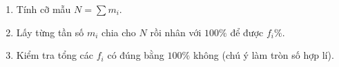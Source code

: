 \begin{enumerate}
\item Tính cỡ mẫu $N = \sum m_i$.
\item Lấy từng tần số $m_i$ chia cho $N$ rồi nhân với $100\%$ để được $f_i\%$.
\item Kiểm tra tổng các $f_i$ có đúng bằng $100\%$ không (chú ý làm tròn số hợp lí).
\end{enumerate}
